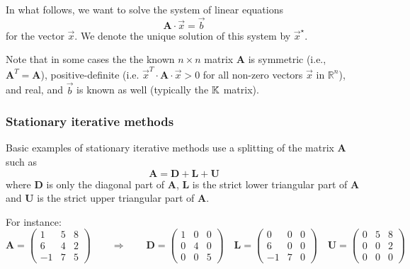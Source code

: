 
In what follows, we want to solve the system of linear equations
\begin{equation}
{\bm A}\cdot \vec{x} = \vec{b} 
\end{equation}
for the vector $\vec{x}$.
We denote the unique solution of this system by $\vec{x}^\star$.

Note that in some cases the the known $n\times n$ matrix ${\bm A}$ is 
symmetric (i.e., ${\bm A}^T = {\bm A}$), 
positive-definite (i.e. $\vec{x}^T\cdot {\bm A} \cdot \vec{x} > 0$ 
for all non-zero vectors $\vec{x}$ in $\mathbb{R}^n$), 
and real, and $\vec{b}$ is known as well (typically the ${\mathbb{K}}$ matrix). 


\subsubsection{Stationary iterative methods}


Basic examples of stationary iterative methods use a splitting of the matrix ${\bm A}$ such as
\[
{\bm A}={\bm D}+{\bm L}+{\bm U}
\]
where ${\bm D}$ is only the diagonal part of ${\bm A}$, 
${\bm L}$ is the strict lower triangular part of ${\bm A}$ and
${\bm U}$ is the strict upper triangular part of ${\bm A}$.

For instance:
\[
{\bm A}=
\left(
\begin{array}{ccc}
1 & 5 & 8 \\
6 & 4 & 2 \\
-1 & 7 & 5
\end{array}
\right)
\qquad
\Rightarrow
\qquad
{\bm D}=
\left(
\begin{array}{ccc}
1 & 0 & 0 \\
0 & 4 & 0 \\
0 & 0 & 5
\end{array}
\right)
\quad
{\bm L}=
\left(
\begin{array}{ccc}
0 & 0 & 0 \\
6 & 0 & 0 \\
-1 & 7 & 0
\end{array}
\right)
\quad
{\bm U}=
\left(
\begin{array}{ccc}
0 & 5 & 8 \\
0 & 0 & 2 \\
0 & 0 & 0
\end{array}
\right)
\]



